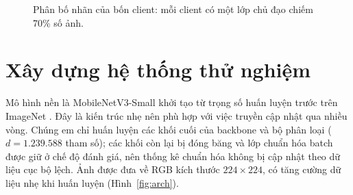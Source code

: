\documentclass[12pt,a4paper]{report}
\begin{document}
\newcommand{\rowbar}[6]{%
 \pgfmathsetmacro{\xa}{#3*7}\pgfmathsetmacro{\xb}{(#3+#4)*7}\pgfmathsetmacro{\xc}{(#3+#4+#5)*7}
 \fill[red!45]    (0,#1) rectangle (\xa,#1+0.55);
 \fill[blue!35]   (\xa,#1) rectangle (\xb,#1+0.55);
 \fill[green!40]  (\xb,#1) rectangle (\xc,#1+0.55);
 \fill[orange!50] (\xc,#1) rectangle (7,#1+0.55);
 \draw (0,#1) rectangle (7,#1+0.55);
 \node[left,font=\footnotesize] at (0,#1+0.275) {#2};
 \pgfmathsetmacro{\ma}{\xa/2}\pgfmathsetmacro{\mb}{(\xa+\xb)/2}\pgfmathsetmacro{\mc}{(\xb+\xc)/2}\pgfmathsetmacro{\md}{(\xc+7)/2}
 \pgfmathtruncatemacro{\pa}{round(#3*100)}\node[font=\scriptsize] at (\ma,#1+0.275) {\pa\%};
 \pgfmathtruncatemacro{\pb}{round(#4*100)}\node[font=\scriptsize] at (\mb,#1+0.275) {\pb\%};
 \pgfmathtruncatemacro{\pc}{round(#5*100)}\node[font=\scriptsize] at (\mc,#1+0.275) {\pc\%};
 \pgfmathtruncatemacro{\pd}{round(#6*100)}\node[font=\scriptsize] at (\md,#1+0.275) {\pd\%};}
\begin{figure}[H]\centering
{}
\caption{Phân bố nhãn của bốn client: mỗi client có một lớp chủ đạo chiếm 70\% số ảnh.}\label{fig:noniid}
\end{figure}

\section{Xây dựng hệ thống thử nghiệm}
Mô hình nền là MobileNetV3-Small khởi tạo từ trọng số huấn luyện trước trên ImageNet \citep{howard,deng}. Đây là kiến trúc nhẹ nên phù hợp với việc truyền cập nhật qua nhiều vòng. Chúng em chỉ huấn luyện các khối cuối của backbone và bộ phân loại ($d=1.239.588$ tham số); các khối còn lại bị đóng băng và lớp chuẩn hóa batch được giữ ở chế độ đánh giá, nên thống kê chuẩn hóa không bị cập nhật theo dữ liệu cục bộ lệch. Ảnh được đưa về RGB kích thước $224\times224$, có tăng cường dữ liệu nhẹ khi huấn luyện (Hình~\ref{fig:arch}).
\end{document}

